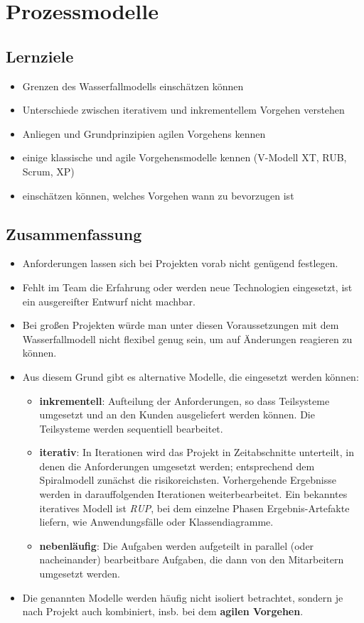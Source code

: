 \section*{Prozessmodelle}

\subsection*{Lernziele}
\begin{itemize}
    \item Grenzen des Wasserfallmodells einschätzen können
    \item Unterschiede zwischen iterativem und inkrementellem Vorgehen verstehen
    \item Anliegen und Grundprinzipien agilen Vorgehens kennen
    \item einige klassische und agile Vorgehensmodelle kennen (V-Modell XT, RUB, Scrum, XP)
    \item einschätzen können, welches Vorgehen wann zu bevorzugen ist
\end{itemize}

\subsection*{Zusammenfassung}

\begin{itemize}
    \item Anforderungen lassen sich bei Projekten vorab nicht genügend festlegen.
    \item Fehlt im Team die Erfahrung oder werden neue Technologien eingesetzt, ist ein ausgereifter Entwurf nicht machbar.
    \item Bei großen Projekten würde man unter diesen Voraussetzungen mit dem Wasserfallmodell nicht flexibel genug sein,
    um auf Änderungen reagieren zu können.
    \item Aus diesem Grund gibt es alternative Modelle, die eingesetzt werden können:
    \begin{itemize}
        \item \textbf{inkrementell}: Aufteilung der Anforderungen, so dass Teilsysteme umgesetzt und an den Kunden ausgeliefert werden können.
        Die Teilsysteme werden sequentiell bearbeitet.
        \item \textbf{iterativ}: In Iterationen wird das Projekt in Zeitabschnitte unterteilt, in denen die Anforderungen umgesetzt werden; entsprechend dem Spiralmodell zunächst die risikoreichsten.
        Vorhergehende Ergebnisse werden in darauffolgenden Iterationen weiterbearbeitet.
        Ein bekanntes iteratives Modell ist \textit{RUP}, bei dem einzelne Phasen Ergebnis-Artefakte liefern, wie Anwendungsfälle oder Klassendiagramme.
        \item \textbf{nebenläufig}: Die Aufgaben werden aufgeteilt in parallel (oder nacheinander) bearbeitbare Aufgaben, die dann von den Mitarbeitern umgesetzt werden.
    \end{itemize}
    \item Die genannten Modelle werden häufig nicht isoliert betrachtet, sondern je nach Projekt auch kombiniert, insb. bei dem \textbf{agilen Vorgehen}.
\end{itemize}

